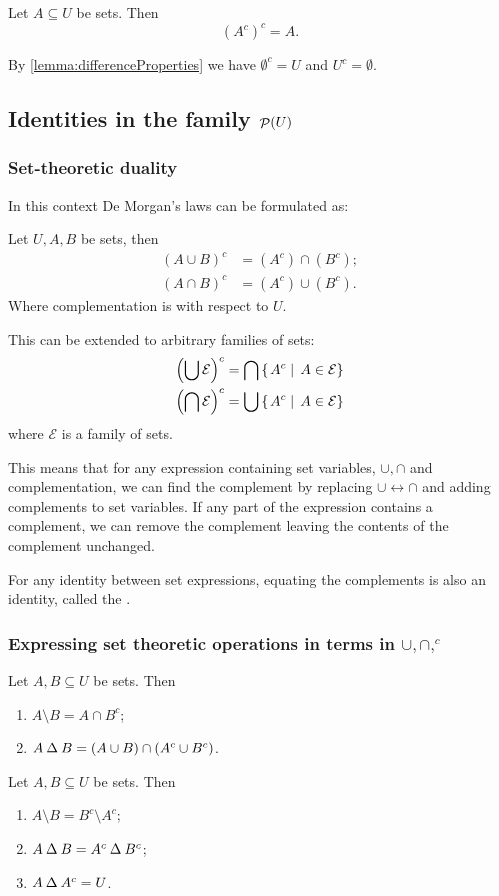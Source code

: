 \begin{lemma}
Let $A\subseteq U$ be sets. Then
\[ (A^c)^c = A. \]
\end{lemma}

By \ref{lemma:differenceProperties} we have $\emptyset^c = U$ and $U^c = \emptyset$.

\subsection{Identities in the family $\mathop{\mathcal{P}}(U)$}
\subsubsection{Set-theoretic duality}
In this context De Morgan's laws can be formulated as:
\begin{proposition}
Let $U,A,B$ be sets, then
\begin{align*}
(A\cup B)^c &= (A^c)\cap (B^c); \\
(A\cap B)^c &= (A^c)\cup (B^c).
\end{align*}
Where complementation is with respect to $U$.

This can be extended to arbitrary families of sets:
\begin{align*}
\left(\bigcup \mathcal{E}\right)^c &= \bigcap\left\{\left. A^c \;\right|\; A\in\mathcal{E} \right\} \\
\left(\bigcap \mathcal{E}\right)^c &= \bigcup\left\{\left. A^c \;\right|\; A\in\mathcal{E} \right\}
\end{align*}
where $\mathcal{E}$ is a family of sets.
\end{proposition}
This means that for any expression containing set variables, $\cup, \cap$ and complementation, we can find the complement by replacing $\cup \leftrightarrow \cap$ and adding complements to set variables. If any part of the expression contains a complement, we can remove the complement leaving the contents of the complement unchanged.

For any identity between set expressions, equating the complements is also an identity, called the .

\subsubsection{Expressing set theoretic operations in terms in $\cup,\cap, ^c$}
\begin{proposition}
Let $A,B\subseteq U$ be sets. Then
\begin{enumerate}
\item $A\setminus B = A \cap B^c$;
\item $A\mathbin{\Delta} B = (A\cup B)\cap (A^c\cup B^c)$.
\end{enumerate}
\end{proposition}
\begin{corollary}
Let $A,B \subseteq U$ be sets. Then
\begin{enumerate}
\item $A\setminus B = B^c\setminus A^c$;
\item $A \mathbin{\Delta} B = A^c \mathbin{\Delta} B^c$;
\item $A \mathbin{\Delta} A^c = U$.
\end{enumerate}
\end{corollary}

